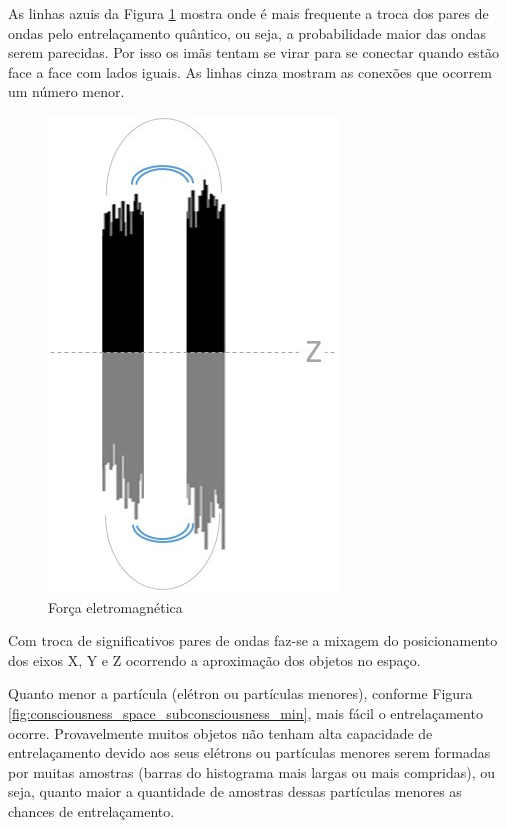 As linhas azuis da Figura \ref{fig:consciousness_electromaagnetic_force} mostra onde é mais frequente a troca dos pares de ondas pelo entrelaçamento quântico, ou seja, a probabilidade maior das ondas serem parecidas. Por isso os imãs tentam se virar para se conectar quando estão face a face com lados iguais. As linhas cinza mostram as conexões que ocorrem um número menor. 
\begin{figure}[H]
\caption{Força eletromagnética}
\label{fig:consciousness_electromaagnetic_force}
\centering
\includegraphics[scale=.8]{sections/images/consciousness_electromaagnetic_force.jpg}
\end{figure}

Com troca de significativos pares de ondas faz-se a mixagem do posicionamento dos eixos X, Y e Z ocorrendo a aproximação dos objetos no espaço. 

Quanto menor a partícula (elétron ou partículas menores), conforme Figura \ref{fig:consciousness_space_subconsciousness_min}, mais fácil o entrelaçamento ocorre. Provavelmente muitos objetos não tenham alta capacidade de entrelaçamento devido aos seus elétrons ou partículas menores serem formadas por muitas amostras (barras do histograma mais largas ou mais compridas), ou seja, quanto maior a quantidade de amostras dessas partículas menores as chances de entrelaçamento.

